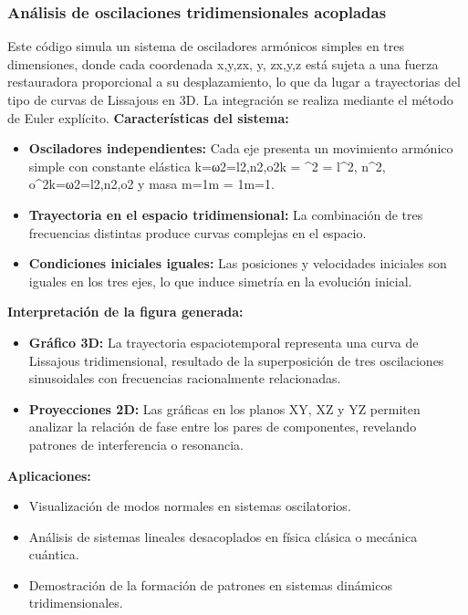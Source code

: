 \documentclass{article}
\begin{document}
\begin{center}
	\subsubsection{Análisis de oscilaciones tridimensionales acopladas}
Este código simula un sistema de osciladores armónicos simples en tres dimensiones, donde cada coordenada x,y,zx, y, zx,y,z está sujeta a una fuerza restauradora proporcional a su desplazamiento, lo que da lugar a trayectorias del tipo de curvas de Lissajous en 3D. La integración se realiza mediante el método de Euler explícito.
\textbf{Características del sistema:}
\begin{itemize}
\item \textbf{Osciladores independientes:} Cada eje presenta un movimiento armónico simple con constante elástica k=ω2=l2,n2,o2k = \omega^2 = l^2, n^2, o^2k=ω2=l2,n2,o2 y masa m=1m = 1m=1.
\item \textbf{Trayectoria en el espacio tridimensional:} La combinación de tres frecuencias distintas produce curvas complejas en el espacio.
\item \textbf{Condiciones iniciales iguales:} Las posiciones y velocidades iniciales son iguales en los tres ejes, lo que induce simetría en la evolución inicial.
\end{itemize}
\textbf{Interpretación de la figura generada:}
\begin{itemize}
\item \textbf{Gráfico 3D:} La trayectoria espaciotemporal representa una curva de Lissajous tridimensional, resultado de la superposición de tres oscilaciones sinusoidales con frecuencias racionalmente relacionadas.
\item \textbf{Proyecciones 2D:} Las gráficas en los planos XY, XZ y YZ permiten analizar la relación de fase entre los pares de componentes, revelando patrones de interferencia o resonancia.
\end{itemize}
\textbf{Aplicaciones:}
\begin{itemize}
\item Visualización de modos normales en sistemas oscilatorios.
\item Análisis de sistemas lineales desacoplados en física clásica o mecánica cuántica.
\item Demostración de la formación de patrones en sistemas dinámicos tridimensionales.
\end{itemize}


\end{center}
\end{document}
